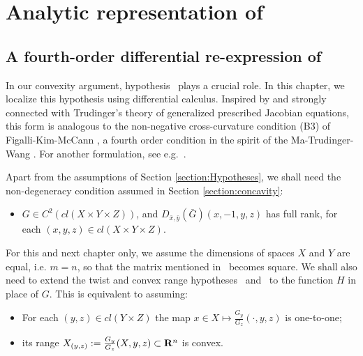 \chapter{Analytic representation of \Gthree}\label{chapter:analytic_representation}



\section{A fourth-order differential re-expression of \Gthree}\label{section:4thorder}



In our convexity argument, hypothesis \Gthree\ plays a crucial role. In this chapter, we 
localize this hypothesis using differential calculus.    Inspired by and strongly connected with Trudinger's theory of generalized prescribed Jacobian equations, this form is analogous to the non-negative cross-curvature condition (B3) 
of Figalli-Kim-McCann \cite{FigalliKimMcCann11}, a fourth order condition in the spirit of the Ma-Trudinger-Wang \cite{MaTrudingerWang05}. For another formulation, see e.g.\ \cite{GuillenKitagawa15}.
\medskip


Apart from the assumptions of Section \ref{section:Hypotheses}, we shall need the non-degeneracy
condition assumed in Section \ref{section:concavity}:
\begin{itemize}
	\item[\Gsix] $G\in C^2(cl(X\times Y \times Z)
	)$, and $D_{\bar{x},\bar{y}}(\bar{G})(x,-1,y,z)$ has full rank, for each $(x,y,z)\in cl(X\times Y\times Z)$. 
\end{itemize}
For this and next chapter only, we assume the dimensions of spaces $X$ and $Y$ are equal, i.e. $m=n$,
so that the matrix mentioned in \Gsix\ becomes square.
We shall also need to extend the twist and convex range hypotheses \Gone\ and \Gtwo\  
to the function $H$ in place of $G$. This is equivalent to assuming:

\begin{itemize}
	\item[\Gseven] For each $(y, z)\in cl( Y \times Z)$ the map $x \in X \longmapsto \frac{G_y}{G_z}(\cdot, y,z)$ is one-to-one;
	\item[\Geight] its range $X_{(y,z)} := \frac{G_y}{G_z}(X,y,z) \subset {\mathbf R}^n$ is convex.
\end{itemize}

